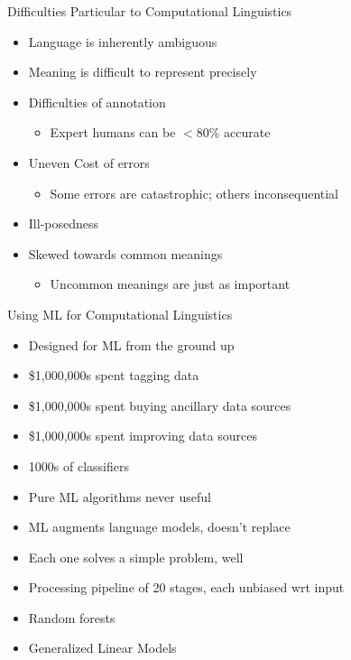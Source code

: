 \documentclass{beamer}
\begin{document}
\begin{frame}{Difficulties Particular to Computational Linguistics}

  \begin{itemize}
  \item Language is inherently ambiguous
  \item Meaning is difficult to represent precisely
  \item Difficulties of annotation
    \begin{itemize}
    \item Expert humans can be $< 80\%$ accurate
    \end{itemize}
  \item Uneven Cost of errors
    \begin{itemize}
    \item Some errors are catastrophic; others inconsequential
    \end{itemize}
  \item Ill-posedness
  \item Skewed towards common meanings
    \begin{itemize}
    \item Uncommon meanings are just as important
    \end{itemize}
  \end{itemize}

\end{frame}

\begin{frame}{Using ML for Computational Linguistics}
\begin{itemize}
\item Designed for ML from the ground up
\item \$1,000,000s spent tagging data
\item \$1,000,000s spent buying ancillary data sources
\item \$1,000,000s spent improving data sources \pause
\item 1000s of classifiers
\item \alert{Pure ML algorithms never useful} \pause
\item ML \alert{augments} language models, doesn't replace
\item Each one solves a simple problem, well
\item Processing pipeline of 20 stages, each unbiased wrt input
\item Random forests
\item Generalized Linear Models
\end{itemize}
\end{frame}
\end{document}

